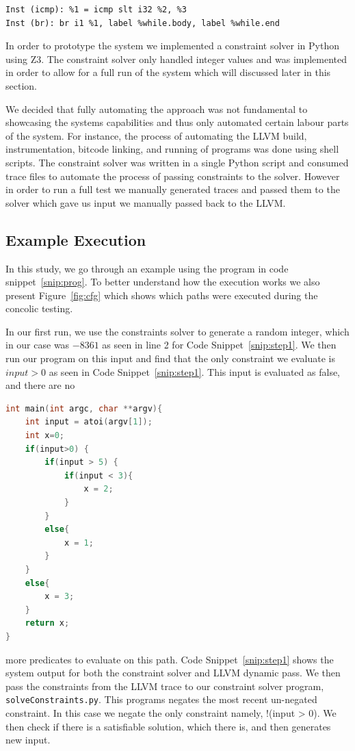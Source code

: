 \begin{lstlisting}[caption={Converting A Loop to Bit Code}, label=snip:loops]
Inst (icmp): %1 = icmp slt i32 %2, %3
Inst (br): br i1 %1, label %while.body, label %while.end
\end{lstlisting}

In order to prototype the system we implemented a constraint solver in Python using Z3. The constraint solver only handled integer values and was implemented in order to allow for a full run of the system which will discussed later in this section. 

We decided that fully automating the approach was not fundamental to showcasing the systems capabilities and thus only automated certain labour parts of the system. For instance, the process of automating the LLVM build, instrumentation, bitcode linking, and running of programs was done using shell scripts. The constraint solver was written in a single Python script and consumed trace files to automate the process of passing constraints to the solver. However in order to run a full test we manually generated traces and passed them to the solver which gave us input we manually passed back to the LLVM.

\subsection{Example Execution}

In this study, we go through an example using the program in code snippet~\ref{snip:prog}. To better understand how the execution works we also present Figure~\ref{fig:cfg} which shows which paths were executed during the concolic testing.

In our first run, we use the constraints solver to generate a random integer, which in our case was $-8361$ as seen in line 2 for Code Snippet~\ref{snip:step1}. We then run our program on this input and find that the only constraint we evaluate is $input > 0$ as seen in Code Snippet~\ref{snip:step1}. This input is evaluated as false, and there are no

\vspace{-0.6cm}

\begin{lstlisting}[caption={Original Program}, language=C, label=snip:prog]
int main(int argc, char **argv){
    int input = atoi(argv[1]);
    int x=0;
    if(input>0) {
        if(input > 5) {
            if(input < 3){
                x = 2;
            }
        }
        else{
            x = 1;
        }
    }
    else{
        x = 3;
    }
    return x;
}
\end{lstlisting}
\noindent
more predicates to evaluate on this path. Code Snippet~\ref{snip:step1} shows the system output for both the constraint solver and LLVM dynamic pass. We then pass the constraints from the LLVM trace to our constraint solver program, \texttt{solveConstraints.py}. This programs
negates the most recent un-negated constraint. In this case we negate the only constraint namely, !(input > 0). We then check if there is a satisfiable solution, which there is, and then generates new input.

